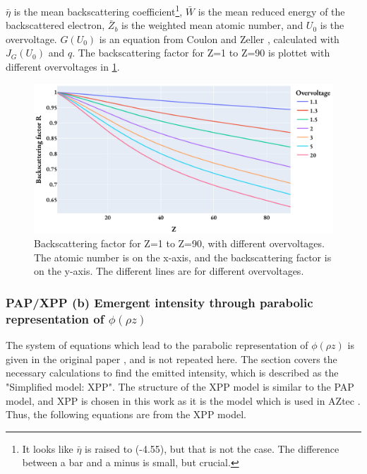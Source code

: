 $\bar{\eta}$ is the mean backscattering coefficient\footnote{It looks like $\bar{\eta}$ is raised to (-4.55), but that is not the case. The difference between a bar and a minus is small, but crucial.}, $\bar{W}$ is the mean reduced energy of the backscattered electron, $\bar{Z}_b$ is the weighted mean atomic number, and $U_0$ is the overvoltage.
$G(U_0)$ is an equation from Coulon and Zeller \cite[Reference 28]{pap_1991}, calculated with $J_G(U_0)$ and $q$.
The backscattering factor for Z=1 to Z=90 is plottet with different overvoltages in \cref{fig:PAP:backscattering_factor}.


\begin{figure}[htbp]
    \centering
    \includegraphics[width=0.8\linewidth]{figures/PAP_backscattering_factor.pdf}
    \caption{
        Backscattering factor for Z=1 to Z=90, with different overvoltages.
        The atomic number is on the x-axis, and the backscattering factor is on the y-axis.
        The different lines are for different overvoltages.
    }
    \label{fig:PAP:backscattering_factor}
\end{figure}





\subsubsection{PAP/XPP (b) Emergent intensity through parabolic representation of $\phi(\rho z)$}

The system of equations which lead to the parabolic representation of $\phi(\rho z)$ is given in the original paper \cite{pap_1991}, and is not repeated here.
The section covers the necessary calculations to find the emitted intensity, which is described as the "Simplified model: XPP".
The structure of the XPP model is similar to the PAP model, and XPP is chosen in this work as it is the model which is used in AZtec .
Thus, the following equations are from the XPP model.


